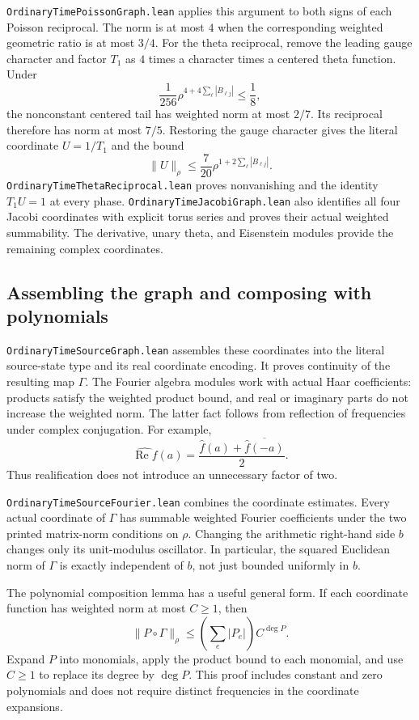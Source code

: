 \documentclass[11pt]{article}
\newcommand{\code}[1]{{\small\nolinkurl{#1}}}
\begin{document}
\code{OrdinaryTimePoissonGraph.lean} applies this argument to both signs
of each Poisson reciprocal. The norm is at most $4$ when the corresponding
weighted geometric ratio is at most $3/4$.
For the theta reciprocal, remove the leading gauge character and factor
$T_1$ as $4$ times a character times a centered theta function. Under
\[
 \frac1{256}\rho^{4+4\sum_\ell|B_{\ell j}|}\le\frac18,
\]
the nonconstant centered tail has weighted norm at most $2/7$.
Its reciprocal therefore has norm at most $7/5$. Restoring the gauge
character gives the literal coordinate $U=1/T_1$ and the bound
\[
 \|U\|_\rho\le\frac7{20}\rho^{1+2\sum_\ell|B_{\ell j}|}.
\]
\code{OrdinaryTimeThetaReciprocal.lean} proves nonvanishing and the
identity $T_1U=1$ at every phase. \code{OrdinaryTimeJacobiGraph.lean}
also identifies all four Jacobi coordinates with explicit torus series
and proves their actual weighted summability. The derivative, unary theta,
and Eisenstein modules provide the remaining complex coordinates.

\subsection{Assembling the graph and composing with polynomials}

\code{OrdinaryTimeSourceGraph.lean} assembles these coordinates into the
literal source-state type and its real coordinate encoding. It proves
continuity of the resulting map $\Gamma$. The Fourier algebra modules
work with actual Haar coefficients: products satisfy the weighted product
bound, and real or imaginary parts do not increase the weighted norm.
The latter fact follows from reflection of frequencies under complex
conjugation. For example,
\[
 \widehat{\operatorname{Re}f}(a)
 =\frac{\widehat f(a)+\overline{\widehat f(-a)}}2.
\]
Thus realification does not introduce an unnecessary factor of two.

\code{OrdinaryTimeSourceFourier.lean} combines the coordinate estimates.
Every actual coordinate of $\Gamma$ has summable weighted Fourier
coefficients under the two printed matrix-norm conditions on $\rho$.
Changing the arithmetic right-hand side $b$ changes only its unit-modulus
oscillator. In particular, the squared Euclidean norm of $\Gamma$ is
exactly independent of $b$, not just bounded uniformly in $b$.

The polynomial composition lemma has a useful general form. If each
coordinate function has weighted norm at most $C\ge1$, then
\[
 \|P\circ\Gamma\|_\rho
 \le \left(\sum_e |P_e|\right) C^{\deg P}.
\]
Expand $P$ into monomials, apply the product bound to each monomial, and
use $C\ge1$ to replace its degree by $\deg P$. This proof includes
constant and zero polynomials and does not require distinct frequencies
in the coordinate expansions.
\end{document}
